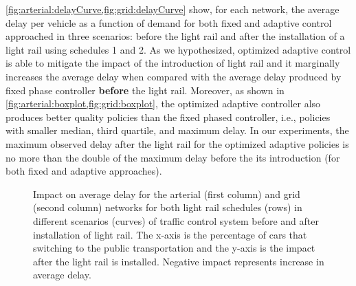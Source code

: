 %
\cref{fig:arterial:delayCurve,fig:grid:delayCurve} show, for each network, the
average delay per vehicle as a function of demand for both fixed and adaptive
control approached in three scenarios: before the light rail and after the
installation of a light rail using schedules 1 and 2.
%
As we hypothesized, optimized adaptive control is able to mitigate the impact of
the introduction of light rail and it marginally increases the average delay
when compared with the average delay produced by fixed phase controller
\textbf{before} the light rail.
%
Moreover, as shown in \cref{fig:arterial:boxplot,fig:grid:boxplot}, the optimized
adaptive controller also produces better quality policies than the fixed phased
controller, i.e., policies with smaller median, third quartile, and maximum
delay.
%
In our experiments, the maximum observed delay after the light rail for the
optimized adaptive policies is no more than the double of the maximum delay before
the its introduction (for both fixed and adaptive approaches).



\begin{figure*}[t!] \centering
%
\caption{Impact on average delay for the arterial (first column) and grid
(second column) networks for both light rail schedules (rows) in different
scenarios (curves) of traffic control system before and after installation of
light rail.
%
The x-axis is the percentage of cars that switching to the public transportation
and the y-axis is the impact after the light rail is installed.
%
Negative impact represents increase in average delay.}
%
\label{fig:impact} \end{figure*}



